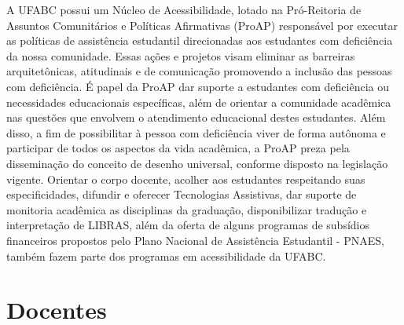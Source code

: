 \documentclass{article}
\begin{document}
A UFABC possui um Núcleo de Acessibilidade, lotado na Pró-Reitoria de Assuntos Comunitários e Políticas Afirmativas (ProAP) responsável por executar as políticas de assistência estudantil direcionadas aos estudantes com deficiência da nossa comunidade. Essas ações e projetos visam eliminar as barreiras arquitetônicas, atitudinais e de comunicação promovendo a inclusão das pessoas com deficiência. É papel da ProAP dar suporte a estudantes com deficiência ou necessidades educacionais específicas, além de orientar a comunidade acadêmica nas questões que envolvem o atendimento educacional destes estudantes. Além disso, a fim de possibilitar à pessoa com deficiência viver de forma autônoma e participar de todos os aspectos da vida acadêmica, a ProAP preza pela disseminação do conceito de desenho universal, conforme disposto na legislação vigente. Orientar o corpo docente, acolher aos estudantes respeitando suas especificidades, difundir e oferecer Tecnologias Assistivas, dar suporte de monitoria acadêmica as disciplinas da graduação, disponibilizar tradução e interpretação de LIBRAS, além da oferta de alguns programas de subsídios financeiros propostos pelo Plano Nacional de Assistência Estudantil - PNAES, também fazem parte dos programas em acessibilidade da UFABC. 




\newpage
\section {Docentes}
\end{document}
